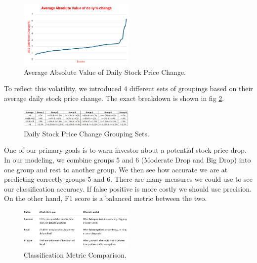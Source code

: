 \documentclass[twocolumn]{article}
\begin{document}
\begin{figure}[ht]
    \centering
    \includegraphics[width=0.5\textwidth]{Average ABS value of daily stock change.png}
    \caption{Average Absolute Value of Daily Stock Price Change.}
    \label{fig:ave abs stock change}
\end{figure}
To reflect this volatility, we introduced 4 different sets of groupings based on their average daily stock price change. The exact breakdown is shown in fig \ref{fig:daily stock price sets}.

\begin{figure}[ht]
    \centering
    \includegraphics[width=0.5\textwidth]{daily stock price change sets.png}
    \caption{Daily Stock Price Change Grouping Sets.}
    \label{fig:daily stock price sets}
\end{figure}

One of our primary goals is to warn investor about a potential stock price drop. In our modeling, we combine groups 5 and 6 (Moderate Drop and Big Drop) into one group and rest to another group. We then see how accurate we are at predicting correctly groups 5 and 6. There are many measures we could use to see our classification accuracy. If false positive is more costly we should use precision.  On the other hand, F1 score is a balanced metric between the two.  

\begin{figure}[ht]
    \centering
    \includegraphics[width=0.5\textwidth]{classification metric comparison.png}
    \caption{Classification Metric Comparison.}
    \label{fig:classificait metric comparison}
\end{figure}
\end{document}

